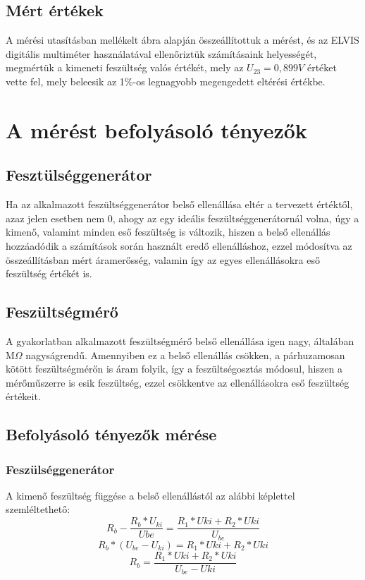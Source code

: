\documentclass[10pt, conference,a4paper]{ITKproc}
\begin{document}
\subsection{Mért értékek}
A mérési utasításban mellékelt ábra alapján összeállítottuk a mérést, és az ELVIS digitális multiméter használatával ellenőriztük számításaink helyességét, megmértük a kimeneti feszültség valós értékét, mely az $U_{23} = 0,899 V$ értéket vette fel, mely beleesik az 1\%-os legnagyobb megengedett eltérési értékbe. 

\section{A mérést befolyásoló tényezők}
\subsection{Fesztülséggenerátor}
Ha az alkalmazott feszültséggenerátor belső ellenállása eltér a tervezett értéktől, azaz jelen esetben nem 0, ahogy az egy ideális feszültséggenerátornál volna, úgy a kimenő, valamint minden eső feszültség is változik, hiszen a belső ellenállás hozzáadódik a számítások során használt eredő ellenálláshoz, ezzel módosítva az összeállításban mért áramerősség, valamin így az egyes ellenállásokra eső feszültség értékét is. 
\subsection{Feszültségmérő}
A gyakorlatban alkalmazott feszültségmérő belső ellenállása igen nagy, általában M$\Omega$ nagyságrendű. Amennyiben ez a belső ellenállás csökken, a párhuzamosan kötött feszültségmérőn is áram folyik, így a feszültségosztás módosul, hiszen a mérőműszerre is esik feszültség, ezzel csökkentve az ellenállásokra eső feszültség értékeit. 
\subsection{Befolyásoló tényezők mérése}
\subsubsection{Feszülséggenerátor}

A kimenő feszültség függése a belső ellenállástól az alábbi képlettel szemléltethető: 
\[R_b-\frac{R_b*U_{ki}}{U{be}} = \frac{R_1*U{ki}+R_2*U{ki}}{U_{be}} \]
\[R_b*(U_{be}-U_{ki}) = R_1*U{ki}+R_2*U{ki} \]
\[R_b = \frac{R_1*U{ki} + R_2*U{ki}}{U_{be}-U{ki}} \]
\end{document}
